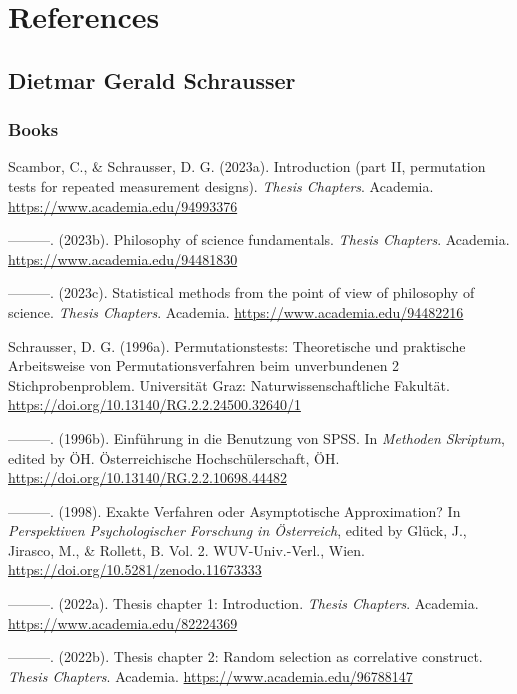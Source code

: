 \documentclass[
]{article}
\author{Dietmar Gerald Schrausser}
\date{11.05.2026}
\begin{document}
\hypertarget{references}{%
\section{References}\label{references}}

\hypertarget{dietmar-gerald-schrausser}{%
\subsection{Dietmar Gerald Schrausser}\label{dietmar-gerald-schrausser}}

\hypertarget{books}{%
\subsubsection{Books}\label{books}}

Scambor, C., \& Schrausser, D. G. (2023a). Introduction (part II,
permutation tests for repeated measurement designs). \emph{Thesis
Chapters}. Academia. \url{https://www.academia.edu/94993376}

---------. (2023b). Philosophy of science fundamentals. \emph{Thesis
Chapters}. Academia. \url{https://www.academia.edu/94481830}

---------. (2023c). Statistical methods from the point of view of
philosophy of science. \emph{Thesis Chapters}. Academia.
\url{https://www.academia.edu/94482216}

Schrausser, D. G. (1996a). Permutationstests: Theoretische und
praktische Arbeitsweise von Permutationsverfahren beim unverbundenen 2
Stichprobenproblem. Universität Graz: Naturwissenschaftliche Fakultät.
\url{https://doi.org/10.13140/RG.2.2.24500.32640/1}

---------. (1996b). Einführung in die Benutzung von SPSS. In
\emph{Methoden Skriptum}, edited by ÖH. Österreichische
Hochschülerschaft, ÖH. \url{https://doi.org/10.13140/RG.2.2.10698.44482}

---------. (1998). Exakte Verfahren oder Asymptotische Approximation? In
\emph{Perspektiven Psychologischer Forschung in Österreich}, edited by
Glück, J., Jirasco, M., \& Rollett, B. Vol. 2. WUV-Univ.-Verl., Wien.
\url{https://doi.org/10.5281/zenodo.11673333}

---------. (2022a). Thesis chapter 1: Introduction. \emph{Thesis
Chapters}. Academia. \url{https://www.academia.edu/82224369}

---------. (2022b). Thesis chapter 2: Random selection as correlative
construct. \emph{Thesis Chapters}. Academia.
\url{https://www.academia.edu/96788147}
\end{document}
